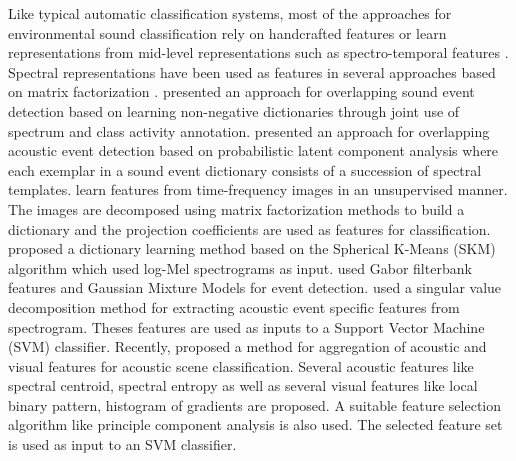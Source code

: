\documentclass[preprint,final,12pt]{elsarticle}
\begin{document}
Like typical automatic classification systems, most of the approaches for environmental sound classification rely on handcrafted features or learn representations from mid-level representations such as spectro-temporal features \citep{ludena2016acoustic,Costa2012}. Spectral representations have been used as features in several approaches based on matrix factorization \citep{mesaros2015soundmatrixf,benetos2016detectionmatrixf,bisot2016acousticmatrixf,salamon2015unsupervised,geiger2015gaborGMM}.
\citet{mesaros2015soundmatrixf} presented an approach for overlapping sound event detection based on learning non-negative dictionaries through joint use of spectrum and class activity annotation. \citet{benetos2016detectionmatrixf} presented an approach for overlapping acoustic event detection based on probabilistic latent component analysis where each exemplar in a sound event dictionary consists of a succession of spectral templates. \citet{bisot2016acousticmatrixf} learn features from time-frequency images in an unsupervised manner. The images are decomposed using matrix factorization methods to build a dictionary and the projection coefficients are used as features for classification. \citet{salamon2015unsupervised} proposed a dictionary learning method based on the Spherical K-Means (SKM) algorithm which used log-Mel spectrograms as input. \citet{geiger2015gaborGMM} used Gabor filterbank features and Gaussian Mixture Models for event detection. \citet{mulimani2019segmentation} used a singular value decomposition method for extracting acoustic event specific features from spectrogram. Theses features are used as inputs to a Support Vector Machine (SVM) classifier. Recently, \citet{XIE2019} proposed a method for aggregation of acoustic and visual features for acoustic scene classification. Several acoustic features like spectral centroid, spectral entropy as well as several visual features like local binary pattern, histogram of gradients are proposed. A suitable feature selection algorithm like principle component analysis is also used. The selected feature set is used as input to an SVM classifier. 
\end{document}
